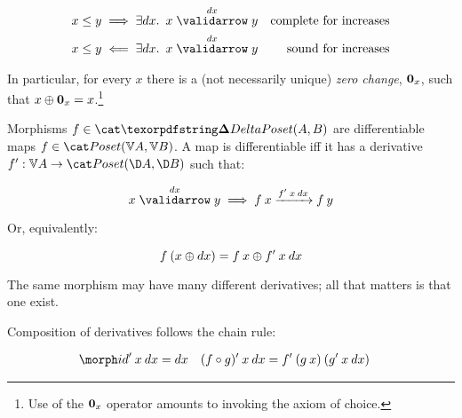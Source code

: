 \documentclass{rntz}\usepackage{fantasy}%
\begin{document}
\nopagebreak[2]
\begin{align*}
  x \le y &\implies \ex{\dx} \vld{\dx} x y
  & \text{complete for increases}\\
  x \le y &\impliedby \ex{\dx} \vld{\dx} x y
  & \text{sound for increases}
\end{align*}

\noindent In particular, for every $x$ there is a (not necessarily unique)
\emph{zero change}, $\boldsymbol{0}_x$, such that $x \mathbin{\oplus} \boldsymbol{0}_x = x$.\footnote{Use of
  the $\boldsymbol{0}_x$ operator amounts to invoking the axiom of choice.}

Morphisms $f \in \CP(A,B)$ are differentiable maps $f \in \Poset(\vals A, \vals
B)$. A map is differentiable iff it has a derivative $\deriv f : \vals A \to
\Poset(\chgs A, \chgs B)$ such that:

\nopagebreak[2]
\[ \vld{\dx} x y \implies \longvld{\deriv f\<x\<\dx}{f\<x}{f\<y}\]

\noindent Or, equivalently:

\nopagebreak[2]
\[ f\<(x \upd \dx) = f\<x \upd \deriv f\<x\<\dx \]


\noindent
The same morphism may have many different derivatives; all that matters is that
one exist.

Composition of derivatives follows the chain rule:

\nopagebreak[2]
\begin{align*}
  \deriv\id \<x\<\dx &= \dx
  & \deriv{(f \circ g)} \<x\<\dx &= \deriv f \<(g\<x) \<(\deriv g\<x\<\dx)
\end{align*}



\end{document}
